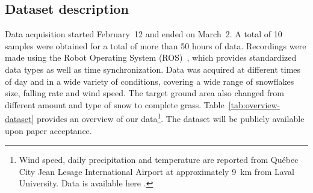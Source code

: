 \subsection{Dataset description}
Data acquisition started February~12 and ended on March~2. A total of 10 samples were obtained for a total of more than 50 hours of data. Recordings were made using the Robot Operating System (ROS)~\cite{ROSWeb}, which provides standardized data types as well as time synchronization. Data was acquired at different times of day and in a wide variety of conditions, covering a wide range of snowflakes size, falling rate and wind speed. The target ground area also changed from different amount and type of snow to complete grass. Table~\ref{tab:overview-dataset} provides an overview of our data\footnote{Wind speed, daily precipitation and temperature are reported from Québec City Jean Lesage International Airport at approximately \SI{9}{\km} from Laval University. Data is available here \cite{WeatherCanada}.}. The dataset will be publicly available upon paper acceptance.

